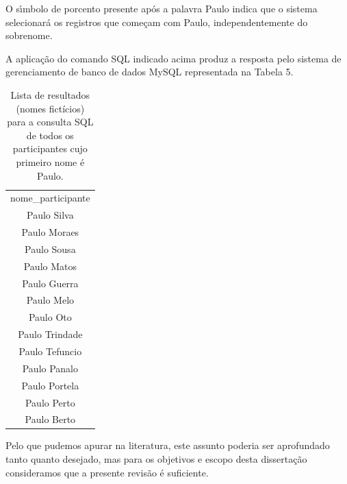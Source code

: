 \documentclass[
12pt,		%
openright,	%
twoside,  %
a4paper,			%
chapter=TITLE,		%
english,			%
french,				%
spanish,			%
brazil				%
]{USPSC-classe/USPSC}
\begin{document}
O s\'{\i}mbolo de porcento presente ap\'os a palavra \textquotedbl  Paulo \textquotedbl  indica que o sistema selecionar\'a os registros que come\c{c}am com \textquotedbl Paulo\textquotedbl , independentemente do sobrenome.

















A aplica\c{c}\~ao do comando SQL indicado acima produz a resposta pelo sistema de gerenciamento de banco de dados MySQL representada na Tabela 5.





















\begin{table}[htb]
\tiny
\caption{\label{fe3cd6334e1b9072eda70730e1734e26869d9c57}Lista de resultados (nomes fict\'{i}cios) para a consulta SQL de todos os participantes cujo primeiro nome \'e Paulo.}

\centering
\begin{tabular}{|c|}
\hline
nome\_participante        \\
Paulo Silva              \\
Paulo Moraes \\
Paulo Sousa \\
Paulo Matos \\
Paulo Guerra \\
Paulo Melo \\
Paulo Oto \\
Paulo Trindade \\
Paulo Tefuncio \\
Paulo Panalo \\
Paulo Portela \\
Paulo Perto \\
Paulo Berto \\
\hline
\end{tabular}
\end{table}


Pelo que pudemos apurar na literatura, este assunto poderia ser aprofundado tanto quanto desejado, mas para os objetivos e escopo desta disserta\c{c}\~ao consideramos que a presente revis\~ao \'e suficiente.
\end{document}
